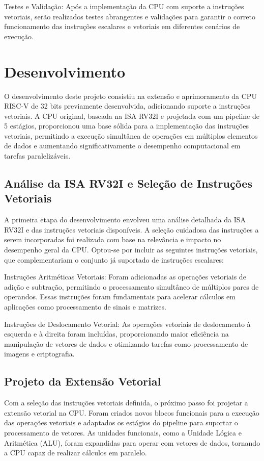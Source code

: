 \documentclass[12pt]{article}
\begin{document}
Testes e Validação: Após a implementação da CPU com suporte a instruções vetoriais, serão realizados testes abrangentes e validações para garantir o correto funcionamento das instruções escalares e vetoriais em diferentes cenários de execução.


\section{Desenvolvimento}

O desenvolvimento deste projeto consistiu na extensão e aprimoramento da CPU RISC-V de 32 bits previamente desenvolvida, adicionando suporte a instruções vetoriais. A CPU original, baseada na ISA RV32I e projetada com um pipeline de 5 estágios, proporcionou uma base sólida para a implementação das instruções vetoriais, permitindo a execução simultânea de operações em múltiplos elementos de dados e aumentando significativamente o desempenho computacional em tarefas paralelizáveis.

\subsection{Análise da ISA RV32I e Seleção de Instruções Vetoriais}


A primeira etapa do desenvolvimento envolveu uma análise detalhada da ISA RV32I e das instruções vetoriais disponíveis. A seleção cuidadosa das instruções a serem incorporadas foi realizada com base na relevância e impacto no desempenho geral da CPU. Optou-se por incluir as seguintes instruções vetoriais, que complementariam o conjunto já suportado de instruções escalares:

Instruções Aritméticas Vetoriais: Foram adicionadas as operações vetoriais de adição e subtração, permitindo o processamento simultâneo de múltiplos pares de operandos. Essas instruções foram fundamentais para acelerar cálculos em aplicações como processamento de sinais e matrizes.

Instruções de Deslocamento Vetorial: As operações vetoriais de deslocamento à esquerda e à direita foram incluídas, proporcionando maior eficiência na manipulação de vetores de dados e otimizando tarefas como processamento de imagens e criptografia.

\subsection{Projeto da Extensão Vetorial}


Com a seleção das instruções vetoriais definida, o próximo passo foi projetar a extensão vetorial na CPU. Foram criados novos blocos funcionais para a execução das operações vetoriais e adaptados os estágios do pipeline para suportar o processamento de vetores. As unidades funcionais, como a Unidade Lógica e Aritmética (ALU), foram expandidas para operar com vetores de dados, tornando a CPU capaz de realizar cálculos em paralelo.
\end{document}
